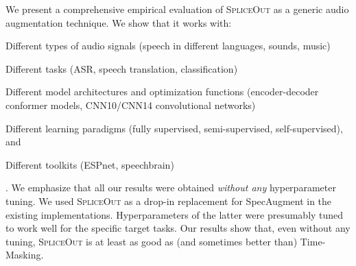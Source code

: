 \documentclass{article}
\newcommand{\SpA}{{\textsc{SpliceOut}}\xspace}
\begin{document}
We present a comprehensive empirical evaluation of \SpA as a generic audio augmentation technique. We show that it works with: \begin{enumerate*}
\item Different types of audio signals (speech in different languages, sounds, music)
\item Different tasks (ASR, speech translation, classification)
\item Different model architectures and optimization functions (encoder-decoder conformer models, CNN10/CNN14 convolutional networks)
\item Different learning paradigms (fully supervised, semi-supervised, self-supervised), and
\item Different toolkits (ESPnet, speechbrain)
\end{enumerate*}. We emphasize that all our results were obtained \emph{without any} hyperparameter tuning. We used \SpA as a drop-in replacement for SpecAugment in the existing implementations. Hyperparameters of the latter were presumably tuned to work well for the specific target tasks. Our results show that, even without any tuning, \SpA is at least as good as (and sometimes better than) Time-Masking.




\end{document}
